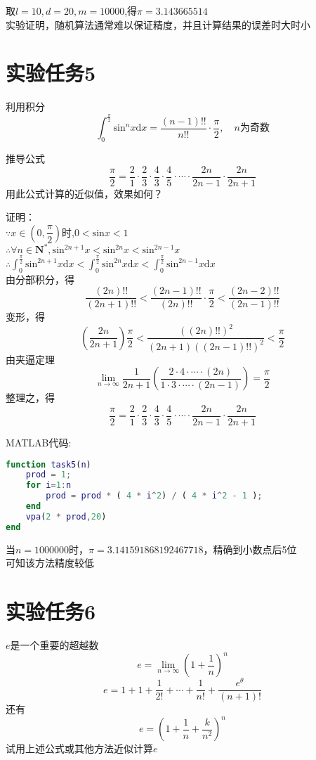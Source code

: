 \documentclass[12pt]{article}
\begin{document}
\begin{CJK*}{UTF8}{gbsn}
	取$l=10,d=20,m=10000$,得$\pi=3.143665514$	\\
	实验证明，随机算法通常难以保证精度，并且计算结果的误差时大时小\\

\section{实验任务5}
	利用积分
	$$\int_0^{\frac{\pi}{2}}\mathrm{sin}^nx\mathrm{d}x=\dfrac{(n-1)!!}{n!!}\cdot{}\dfrac{\pi}{2},\quad{}n\text{为奇数}$$
	
	推导公式
	$$\dfrac{\pi}{2}=\dfrac{2}{1}\cdot\dfrac{2}{3}\cdot\dfrac{4}{3}\cdot\dfrac{4}{5}\cdot\cdots\cdot\dfrac{2n}{2n-1}\cdot\dfrac{2n}{2n+1}$$
	用此公式计算的近似值，效果如何？
	
	证明：\\
	$\because x\in{}\left(0,\dfrac{\pi}{2}\right)$时,$0<\mathrm{sin}x<1$\\
	$\therefore \forall{n\in{\mathbf{N^*}}},\mathrm{sin}^{2n+1}x<\mathrm{sin}^{2n}x<\mathrm{sin}^{2n-1}x$\\
	$\therefore \int_0^{\frac{\pi}{2}}\mathrm{sin}^{2n+1}x\mathrm{d}x<\int_0^{\frac{\pi}{2}}\mathrm{sin}^{2n}x\mathrm{d}x<\int_0^{\frac{\pi}{2}}\mathrm{sin}^{2n-1}x\mathrm{d}x$\\
	由分部积分，得
	$$\frac{(2n)!!}{(2n+1)!!}<\frac{(2n-1)!!}{(2n)!!}\cdot\frac{\pi}{2}<\frac{(2n-2)!!}{(2n-1)!!}$$
	变形，得
	$$\left(\frac{2n}{2n+1}\right)\frac{\pi}{2}<\frac{((2n)!!)^2}{(2n+1)((2n-1)!!)^2}<\frac{\pi}{2}$$
	由夹逼定理
	$$\lim_{n\to\infty}\frac{1}{2n+1}\left(\frac{2\cdot{4}\cdot\cdots\cdot{(2n)}}{1\cdot{3}\cdot\cdots\cdot{(2n-1)}}\right)=\dfrac{\pi}{2}$$
	整理之，得
	$$\dfrac{\pi}{2}=\dfrac{2}{1}\cdot\dfrac{2}{3}\cdot\dfrac{4}{3}\cdot\dfrac{4}{5}\cdot\cdots\cdot\dfrac{2n}{2n-1}\cdot\dfrac{2n}{2n+1}$$
	
	MATLAB代码:
	
	\begin{lstlisting}[language=matlab]
function task5(n)
    prod = 1;
    for i=1:n
        prod = prod * ( 4 * i^2) / ( 4 * i^2 - 1 );
    end
    vpa(2 * prod,20)
end	
	\end{lstlisting}
	
	当$n=1000000$时，$\pi=3.141591868192467718$，精确到小数点后5位\\
	可知该方法精度较低

\section{实验任务6}
	$e$是一个重要的超越数\\
	$$e=\lim_{n\to\infty}\left(1+\dfrac{1}{n}\right)^n$$
	$$e=1+1+\dfrac{1}{2!}+\cdots+\dfrac{1}{n!}+\dfrac{e^\theta}{(n+1)!}$$
	还有\\
	$$e=\left(1+\dfrac{1}{n}+\dfrac{k}{n^2}\right)^n$$
	试用上述公式或其他方法近似计算$e$
	

\end{CJK*}
\end{document}
